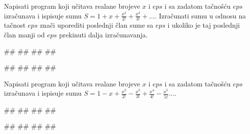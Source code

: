 \begin{Exercise}[difficulty=1, label=1.3_42] 
Napisati program koji učitava realane brojeve $x$ i $eps$ i sa zadatom
tačnošću $eps$ izračunava i ispisuje sumu
$S=1+x+\frac{x^2}{2!}+\frac{x^3}{3!}+\ldots$.  Izračunati sumu u
odnosu na tačnost $eps$ znači uporediti poslednji član sume sa $eps$ i
ukoliko je taj poslednji član manji od $eps$ prekinuti dalja
izračunavanja.  
  
\begin{miditest}
\begin{upotreba}{1}
#\naslovInt#
##
##
##
\end{upotreba}
\end{miditest}
\begin{miditest}
\begin{upotreba}{2}
#\naslovInt#
##
##
##
\end{upotreba}
\end{miditest}
\end{Exercise}
\begin{Answer}[ref=1.3_42]
\end{Answer}


\begin{Exercise}[difficulty=1, label=1.3_43]
Napisati program koji učitava realane brojeve $x$ i $eps$ i sa zadatom
tačnošću $eps$ izračunava i ispisuje sumu
$S=1-x+\frac{x^2}{2!}-\frac{x^3}{3!}+\frac{x^4}{4!}-\frac{x^5}{5!}\ldots$.
  
\begin{miditest}
\begin{upotreba}{1}
#\naslovInt#
##
##
##
\end{upotreba}
\end{miditest}
\begin{miditest}
\begin{upotreba}{2}
#\naslovInt#
##
##
##
\end{upotreba}
\end{miditest}
\end{Exercise}
\begin{Answer}[ref=1.3_43]
\end{Answer}

